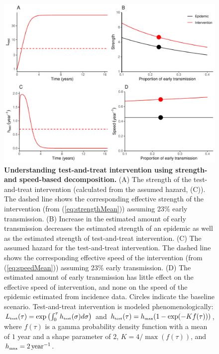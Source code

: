 \documentclass[12pt]{article}
\newcommand{\tsub}[2]{#1_{{\textrm{\tiny #2}}}}
\newcommand{\figlab}[1]{\label{fig:#1}}
\newcommand{\eqref}[1]{(\ref{eq:#1})}
\begin{document}
\begin{figure}[!t]
\includegraphics[width=\textwidth]{../figure/test_and_treat.pdf}
\caption{
\textbf{Understanding test-and-treat intervention using strength- and speed-based decomposition.}
(A) The strength of the test-and-treat intervention (calculated from the assumed hazard, (C)). The dashed line shows the corresponding effective strength of the intervention (from \eqref{strengthMean}) assuming 23\% early transmission.
(B) Increase in the estimated amount of early transmission decreases the estimated strength of an epidemic as well as the estimated strength of test-and-treat intervention.
(C) The assumed hazard for the test-and-treat intervention. 
The dashed line shows the corresponding effective speed of the intervention (from \eqref{speedMean}) assuming 23\% early transmission.
(D) The estimated amount of early transmission has little effect on the effective speed of intervention, and none on the speed of the epidemic estimated from incidence data.
Circles indicate the baseline scenario.
Test-and-treat intervention is modeled phenomenologically: $\tsub{L}{test}(\tau) = \exp\left(\int_0^\tau \tsub{h}{test}(\sigma) d\sigma \right)$ and $\tsub{h}{test}(\tau) = \tsub{h}{max} (1 - \exp(- K f(\tau)))$, where $f(\tau)$ is a gamma probability density function with a mean of $1$ year and a shape parameter of 2, $K = 4/\max(f(\tau))$, and $\tsub{h}{max} = 2\,\mathrm{year}^{-1}$.
}
\figlab{test}
\end{figure}
\end{document}
